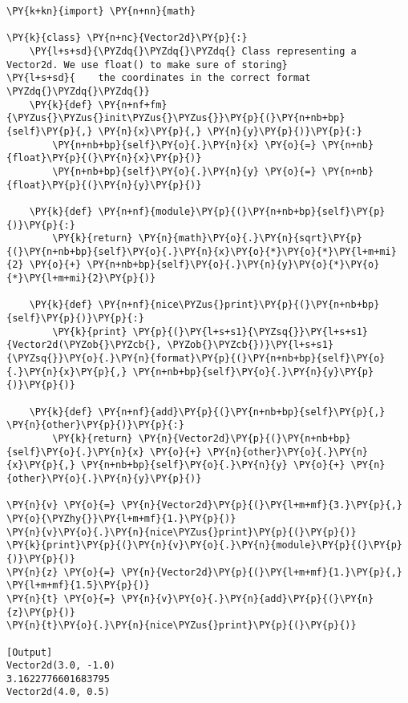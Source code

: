 \begin{Verbatim}[label=\makebox{\url{https://github.com/lucabaldini/cmepda/tree/master/slides/latex/snippets/vector2d\_naive.py}},commandchars=\\\{\}]
\PY{k+kn}{import} \PY{n+nn}{math}

\PY{k}{class} \PY{n+nc}{Vector2d}\PY{p}{:}
    \PY{l+s+sd}{\PYZdq{}\PYZdq{}\PYZdq{} Class representing a Vector2d. We use float() to make sure of storing}
\PY{l+s+sd}{    the coordinates in the correct format \PYZdq{}\PYZdq{}\PYZdq{}}   
    \PY{k}{def} \PY{n+nf+fm}{\PYZus{}\PYZus{}init\PYZus{}\PYZus{}}\PY{p}{(}\PY{n+nb+bp}{self}\PY{p}{,} \PY{n}{x}\PY{p}{,} \PY{n}{y}\PY{p}{)}\PY{p}{:}
        \PY{n+nb+bp}{self}\PY{o}{.}\PY{n}{x} \PY{o}{=} \PY{n+nb}{float}\PY{p}{(}\PY{n}{x}\PY{p}{)}
        \PY{n+nb+bp}{self}\PY{o}{.}\PY{n}{y} \PY{o}{=} \PY{n+nb}{float}\PY{p}{(}\PY{n}{y}\PY{p}{)}
   
    \PY{k}{def} \PY{n+nf}{module}\PY{p}{(}\PY{n+nb+bp}{self}\PY{p}{)}\PY{p}{:}
        \PY{k}{return} \PY{n}{math}\PY{o}{.}\PY{n}{sqrt}\PY{p}{(}\PY{n+nb+bp}{self}\PY{o}{.}\PY{n}{x}\PY{o}{*}\PY{o}{*}\PY{l+m+mi}{2} \PY{o}{+} \PY{n+nb+bp}{self}\PY{o}{.}\PY{n}{y}\PY{o}{*}\PY{o}{*}\PY{l+m+mi}{2}\PY{p}{)}
       
    \PY{k}{def} \PY{n+nf}{nice\PYZus{}print}\PY{p}{(}\PY{n+nb+bp}{self}\PY{p}{)}\PY{p}{:}
        \PY{k}{print} \PY{p}{(}\PY{l+s+s1}{\PYZsq{}}\PY{l+s+s1}{Vector2d(\PYZob{}\PYZcb{}, \PYZob{}\PYZcb{})}\PY{l+s+s1}{\PYZsq{}}\PY{o}{.}\PY{n}{format}\PY{p}{(}\PY{n+nb+bp}{self}\PY{o}{.}\PY{n}{x}\PY{p}{,} \PY{n+nb+bp}{self}\PY{o}{.}\PY{n}{y}\PY{p}{)}\PY{p}{)}
   
    \PY{k}{def} \PY{n+nf}{add}\PY{p}{(}\PY{n+nb+bp}{self}\PY{p}{,} \PY{n}{other}\PY{p}{)}\PY{p}{:}
        \PY{k}{return} \PY{n}{Vector2d}\PY{p}{(}\PY{n+nb+bp}{self}\PY{o}{.}\PY{n}{x} \PY{o}{+} \PY{n}{other}\PY{o}{.}\PY{n}{x}\PY{p}{,} \PY{n+nb+bp}{self}\PY{o}{.}\PY{n}{y} \PY{o}{+} \PY{n}{other}\PY{o}{.}\PY{n}{y}\PY{p}{)}
       
\PY{n}{v} \PY{o}{=} \PY{n}{Vector2d}\PY{p}{(}\PY{l+m+mf}{3.}\PY{p}{,} \PY{o}{\PYZhy{}}\PY{l+m+mf}{1.}\PY{p}{)}
\PY{n}{v}\PY{o}{.}\PY{n}{nice\PYZus{}print}\PY{p}{(}\PY{p}{)}
\PY{k}{print}\PY{p}{(}\PY{n}{v}\PY{o}{.}\PY{n}{module}\PY{p}{(}\PY{p}{)}\PY{p}{)}
\PY{n}{z} \PY{o}{=} \PY{n}{Vector2d}\PY{p}{(}\PY{l+m+mf}{1.}\PY{p}{,} \PY{l+m+mf}{1.5}\PY{p}{)}
\PY{n}{t} \PY{o}{=} \PY{n}{v}\PY{o}{.}\PY{n}{add}\PY{p}{(}\PY{n}{z}\PY{p}{)}
\PY{n}{t}\PY{o}{.}\PY{n}{nice\PYZus{}print}\PY{p}{(}\PY{p}{)}

[Output]
Vector2d(3.0, -1.0)
3.1622776601683795
Vector2d(4.0, 0.5)
\end{Verbatim}